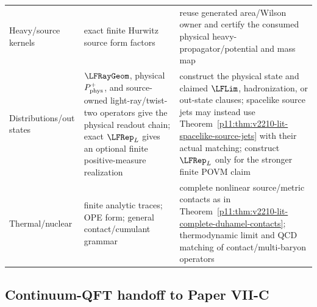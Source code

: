 \documentclass[12pt,a4paper]{article}
\begin{document}
\begin{longtable}{>{\raggedright\arraybackslash}p{} >{\raggedright\arraybackslash}p{} >{\raggedright\arraybackslash}p{}}
Heavy/source kernels & exact finite Hurwitz source form factors & reuse generated area/Wilson owner and certify the consumed physical heavy-propagator/potential and mass map \\
Distributions/out states & \(\LFRayGeom\), physical \(P_{\rm phys}^+\), and source-owned light-ray/twist-two operators give the physical readout chain; exact \(\LFRep_L\) gives an optional finite positive-measure realization & construct the physical state and claimed \(\LFLim\), hadronization, or out-state clauses; spacelike source jets may instead use Theorem~\ref{p11:thm:v2210-lit-spacelike-source-jets} with their actual matching; construct \(\LFRep_L\) only for the stronger finite POVM claim \\
Thermal/nuclear & finite analytic traces; OPE form; general contact/cumulant grammar & complete nonlinear source/metric contacts as in Theorem~\ref{p11:thm:v2210-lit-complete-duhamel-contacts}; thermodynamic limit and QCD matching of contact/multi-baryon operators \\
\bottomrule
\end{longtable}



\label{p11:part:paper-xii-handoff}


\subsection{Continuum-QFT handoff to Paper VII-C}
\label{p11:sec:clay-continuum-boundary}
\label{p11:sec:paper-xii-continuum-handoff}
\end{document}
